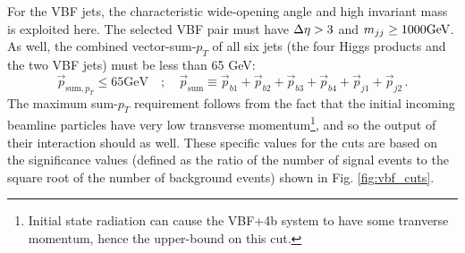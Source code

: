         For the VBF jets, the characteristic wide-opening angle and high invariant mass is exploited here.
        The selected VBF pair must have $\Delta \eta > 3$ and $m_{jj} \geq 1000 \textrm{GeV}$.
        As well, the combined vector-sum-$p_T$ of all six jets
            (the four Higgs products and the two VBF jets)
            must be less than 65 GeV:
        \begin{equation}
            \vec{p}_{\textrm{sum}, p_T} \leq 65 \textrm{GeV} \quad;\quad
            \vec{p}_{\textrm{sum}} \equiv
            \vec{p}_{b1} + \vec{p}_{b2} + 
            \vec{p}_{b3} + \vec{p}_{b4} +
            \vec{p}_{j1} + \vec{p}_{j2} 
            \,.
        \end{equation}
        The maximum sum-$p_T$ requirement follows from the fact that the initial incoming beamline particles have
            very low transverse momentum\footnote{
                Initial state radiation can cause the VBF+4b system to have some tranverse momentum,
                    hence the upper-bound on this cut.
            }, and so the output of their interaction should as well.
        These specific values for the cuts are based on the significance values
            (defined as the ratio of the number of signal events to the square root of the number of background events)
            shown in Fig. \ref{fig:vbf_cuts}.

